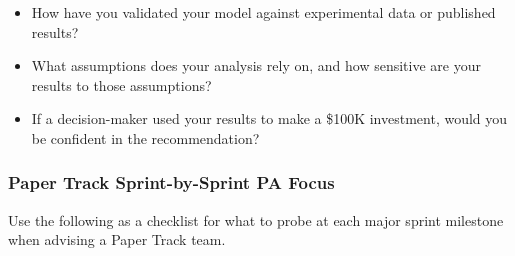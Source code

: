 \begin{paquestion}
\begin{itemize}[nosep,leftmargin=1.5em]
\item How have you validated your model against experimental data or published results?
\item What assumptions does your analysis rely on, and how sensitive are your results to those assumptions?
\item If a decision-maker used your results to make a \$100K investment, would you be confident in the recommendation?
\end{itemize}
\end{paquestion}

\subsubsection{Paper Track Sprint-by-Sprint PA Focus}

Use the following as a checklist for what to probe at each major sprint milestone when advising a Paper Track team.

